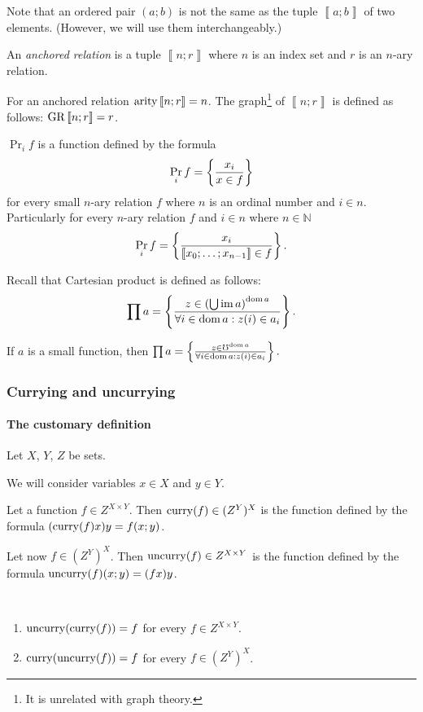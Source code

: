 Note that an ordered pair $(a;b)$ is not the same as the tuple $\left\llbracket a;b\right\rrbracket $
of two elements. (However, we will use them interchangeably.)
\begin{defn}
An \emph{anchored relation} is a tuple $\left\llbracket n;r\right\rrbracket $
where $n$ is an index set and $r$ is an $n$-ary relation.
\end{defn}
For an anchored relation $\operatorname{arity}\left\llbracket n;r\right\rrbracket =n$.
The graph\footnote{It is unrelated with graph theory.} of $\left\llbracket n;r\right\rrbracket $
is defined as follows: $\operatorname{GR}\left\llbracket n;r\right\rrbracket =r$.
\begin{defn}
$\Pr_{i}f$ is a function defined by the formula
\[
\Pr_{i}f=\left\{ \frac{x_{i}}{x\in f}\right\}
\]
for every small $n$-ary relation $f$ where $n$ is an ordinal number
and $i\in n$. Particularly for every $n$-ary relation $f$ and $i\in n$
where $n\in\mathbb{N}$
\[
\Pr_{i}f=\left\{ \frac{x_{i}}{\left\llbracket x_{0};\ldots;x_{n-1}\right\rrbracket \in f}\right\}.
\]

\end{defn}
Recall that Cartesian product is defined
as follows:
\[
\prod a=\left\{ \frac{z\in\left(\bigcup\operatorname{im} a\right)^{\operatorname{dom} a}}{\forall i\in\operatorname{dom} a:z(i)\in a_{i}}\right\}.
\]

\begin{obvious}
If $a$ is a small function, then $\prod a=\left\{ \frac{z\in\mho^{\operatorname{dom} a}}{\forall i\in\operatorname{dom} a:z(i)\in a_{i}}\right\}.$
\end{obvious}

\subsubsection{Currying and uncurrying}


\paragraph{The customary definition}

Let $X$, $Y$, $Z$ be sets.

We will consider variables $x\in X$ and $y\in Y$.

Let a function $f\in Z^{X\times Y}$. Then $\operatorname{curry}(f)\in(Z^{Y})^{X}$
is the function defined by the formula $(\operatorname{curry}(f)x)y=f(x;y)$.

Let now $f\in(Z^{Y})^{X}$. Then $\operatorname{uncurry}(f)\in Z^{X\times Y}$
is the function defined by the formula $\operatorname{uncurry}(f)(x;y)=(fx)y$.
\begin{obvious}
~
\begin{enumerate}
\item $\operatorname{uncurry}(\operatorname{curry}(f))=f$ for every $f\in Z^{X\times Y}$.
\item $\operatorname{curry}(\operatorname{uncurry}(f))=f$ for every $f\in(Z^{Y})^{X}$.
\end{enumerate}
\end{obvious}

